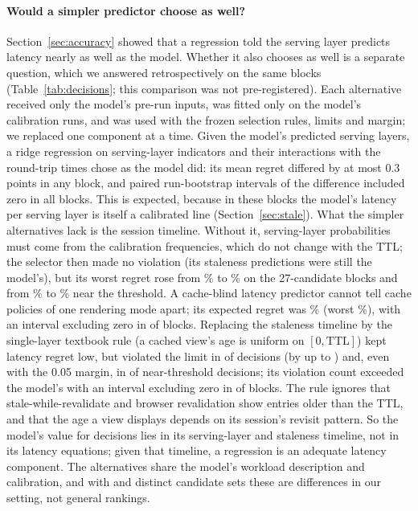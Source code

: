 \documentclass[acmsmall,review,nonacm]{acmart}
\begin{document}
\paragraph{Would a simpler predictor choose as well?}
Section~\ref{sec:accuracy} showed that a regression told the serving layer predicts latency nearly as well as the model. Whether it also chooses as well is a separate question, which we answered retrospectively on the same blocks (Table~\ref{tab:decisions}; this comparison was not pre-registered). Each alternative received only the model's pre-run inputs, was fitted only on the model's calibration runs, and was used with the frozen selection rules, limits and margin; we replaced one component at a time. Given the model's predicted serving layers, a ridge regression on serving-layer indicators and their interactions with the round-trip times chose as the model did: its mean regret differed by at most 0.3 points in any block, and paired run-bootstrap intervals of the difference included zero in all \decBlocks{} blocks. This is expected, because in these blocks the model's latency per serving layer is itself a calibrated line (Section~\ref{sec:stale}). What the simpler alternatives lack is the session timeline. Without it, serving-layer probabilities must come from the calibration frequencies, which do not change with the TTL; the selector then made no violation (its staleness predictions were still the model's), but its worst regret rose from \decCatModelWorst\% to \decCatCalfreqWorst\% on the 27-candidate blocks and from \decHardModelWorst\% to \decHardCalfreqWorst\% near the threshold. A cache-blind latency predictor cannot tell cache policies of one rendering mode apart; its expected regret was \decCatBlindMean\% (worst \decCatBlindWorst\%), with an interval excluding zero in \decBlindSig{} of \decBlocks{} blocks. Replacing the staleness timeline by the single-layer textbook rule (a cached view's age is uniform on $[0,\text{TTL}]$) kept latency regret low, but violated the limit in \decCatSingleViol{} of \decCatSingleN{} decisions (by up to \decCatSingleExc) and, even with the 0.05 margin, in \decHardSingleViol{} of \decHardSingleN{} near-threshold decisions; its violation count exceeded the model's with an interval excluding zero in \decSingleSig{} of \decBlocks{} blocks. The rule ignores that stale-while-revalidate and browser revalidation show entries older than the TTL, and that the age a view displays depends on its session's revisit pattern. So the model's value for decisions lies in its serving-layer and staleness timeline, not in its latency equations; given that timeline, a regression is an adequate latency component. The alternatives share the model's workload description and calibration, and with \decCatScen{} and \decHardScen{} distinct candidate sets these are differences in our setting, not general rankings.
\end{document}
